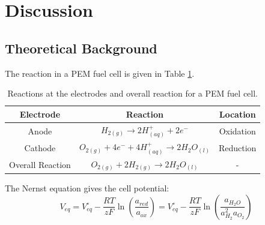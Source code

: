 \section{Discussion}
\subsection{Theoretical Background}

The reaction in a PEM fuel cell is given in Table \ref{tab:PEM_fuel_cell_reactions}.
\begin{table}[H]
\centering
\caption{Reactions at the electrodes and overall reaction for a PEM fuel cell.}
\begin{tabular}{|c|c|c|}
\hline
\textbf{Electrode} & \textbf{Reaction} & \textbf{Location} \\ \hline
Anode & $H_{2(g)} \xrightarrow{} 2H^+_{(aq)} + 2e^-$ & Oxidation \\ \hline
Cathode & $O_{2(g)} + 4e^- + 4H^+_{(aq)} \xrightarrow{} 2H_2O_{(l)}$ & Reduction \\ \hline
Overall Reaction & $O_{2(g)} + 2H_{2(g)} \xrightarrow{} 2H_2O_{(l)}$ & - \\ \hline
\end{tabular}
\label{tab:PEM_fuel_cell_reactions}
\end{table}

The Nernst equation gives the cell potential:
\begin{equation}
    V_{eq} = V^{\circ}_{eq} - \frac{RT}{zF} \ln \left( \frac{a_{red}}{a_{ox}} \right) = V^{\circ}_{eq} - \frac{RT}{zF} \ln \left( \frac{a_{H_2O}}{a_{H_2}^2 a_{O_2}} \right)
\end{equation}

